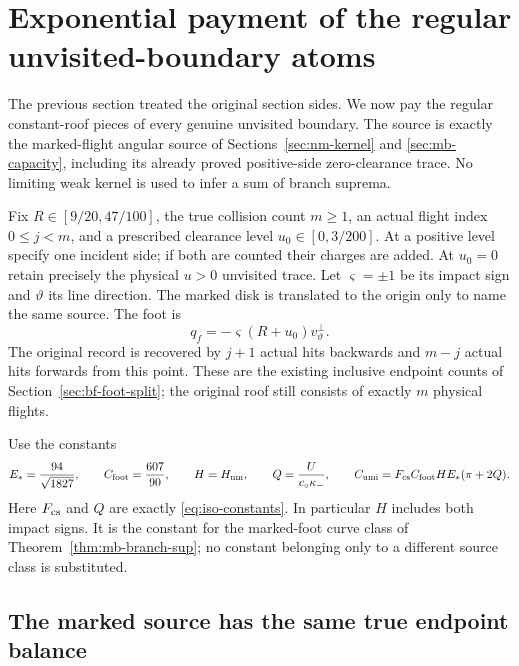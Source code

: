 \section{Exponential payment of the regular unvisited-boundary atoms}
\label{sec:umi-unvisited}

The previous section treated the original section sides. We now
pay the regular constant-roof pieces of every genuine unvisited
boundary. The source is exactly the marked-flight angular source
of Sections~\ref{sec:nm-kernel} and \ref{sec:mb-capacity}, including
its already proved positive-side zero-clearance trace. No limiting
weak kernel is used to infer a sum of branch suprema.

Fix $R\in[9/20,47/100]$, the true collision count $m\ge1$, an
actual flight index $0\le j<m$, and a prescribed clearance level
$u_0\in[0,3/200]$. At a positive level specify one incident side;
if both are counted their charges are added. At $u_0=0$ retain
precisely the physical $u>0$ unvisited trace. Let $\varsigma=\pm1$
be its impact sign and $\vartheta$ its line direction. The marked
disk is translated to the origin only to name the same source.
The foot is
\[
 q_f=-\varsigma(R+u_0)v_\vartheta^\perp.
\]
The original record is recovered by $j+1$ actual hits backwards
and $m-j$ actual hits forwards from this point. These are the
existing inclusive endpoint counts of
Section~\ref{sec:bf-foot-split}; the original roof still consists
of exactly $m$ physical flights.

Use the constants
\begin{equation}\label{eq:umi-constants}
 E_* =\frac{94}{\sqrt{1827}},\qquad
 C_{\rm foot}=\frac{607}{90},\qquad H=H_{\rm nm},\qquad
 Q=\frac{U}{c_\circ\kappa_-},\qquad
 C_{\rm umi}=F_{\rm cs}C_{\rm foot}HE_*(\pi+2Q).
\end{equation}
Here $F_{\rm cs}$ and $Q$ are exactly
\eqref{eq:iso-constants}. In particular $H$ includes both impact
signs. It is the constant for the marked-foot curve class of
Theorem~\ref{thm:mb-branch-sup}; no constant belonging only to a
different source class is substituted.

\subsection{The marked source has the same true endpoint balance}

